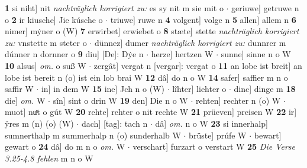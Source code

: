 \documentclass[8pt,a4paper,notitlepage]{article}
\begin{document}
\begin{table}[ht]
\begin{minipage}[t]{0.5\linewidth}
\textbf{1} si niht] nit \textit{nachträglich korrigiert zu:} es sy nit m sie mit o  $\cdot$ geriuwe] getruwe n o \textbf{2} ir kiusche] Jie kúsche o  $\cdot$ triuwe] ruwe n \textbf{4} volgent] volge n \textbf{5} allen] allem n \textbf{6} nimer] mẏner o (W) \textbf{7} erwirbet] erwiebet o \textbf{8} stæte] stette \textit{nachträglich korrigiert zu:} vnstette m steter o  $\cdot$ dünnez] dumer \textit{nachträglich korrigiert zu: } dunnrer m dúnner n dornner o \textbf{9} diu] [De]: Dẏe n  $\cdot$ herze] hertzen W  $\cdot$ sunne] sinne n o W \textbf{10} alsus] \textit{om.} o suß W  $\cdot$ zergât] vergat n [vergar]: vergat o \textbf{11} an lobe ist breit] an lobe ist bereit n (o) ist ein lob brai W \textbf{12} dâ] do n o W \textbf{14} safer] saffier m n o saffir W  $\cdot$ in] in dem W \textbf{15} ine] Jch n o (W)  $\cdot$ lîhter] liehter o  $\cdot$ dinc] dinge m \textbf{18} die] \textit{om.} W  $\cdot$ sîn] sint o drin W \textbf{19} den] Die n o W  $\cdot$ rehten] rechter n (o) W  $\cdot$ muot] nuͯt o gút W \textbf{20} rehte] rehter o nit rechte W \textbf{21} prüeven] preisen W \textbf{22} ir] ÿres m (n) (o) (W)  $\cdot$ dach] [tag]: tach n  $\cdot$ dâ] \textit{om.} n o W \textbf{23} si innerhalp] sumnerthalp m summerhalp n (o) sunderhalb W  $\cdot$ brüste] prúfe W  $\cdot$ bewart] gewart o \textbf{24} dâ] do m n o \textit{om.} W  $\cdot$ verschart] furzart o verstart W \textbf{25} \textit{Die Verse 3.25-4.8 fehlen} m n o W  \newline
\end{minipage}
\end{table}
\newpage
\end{document}
